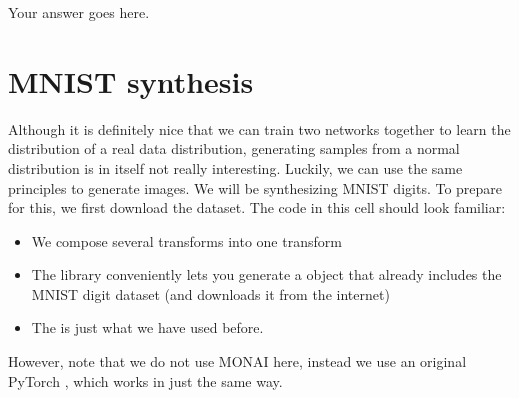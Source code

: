 \documentclass[letterpaper,10pt,english]{jupyterBook}
\begin{document}
\sphinxAtStartPar
Your answer goes here.


\chapter{MNIST synthesis}
\label{\detokenize{notebooks/Tutorial4_Generative_Models/Tutorial4_Generative_Models_student:mnist-synthesis}}
\sphinxAtStartPar
Although it is definitely nice that we can train two networks together to learn the distribution of a real data distribution, generating samples from a normal distribution is in itself not really interesting. Luckily, we can use the same principles to generate images. We will be synthesizing MNIST digits. To prepare for this, we first download the dataset. The code in this cell should look familiar:
\begin{itemize}
\item {} 
\sphinxAtStartPar
We compose several transforms into one transform

\item {} 
\sphinxAtStartPar
The  library conveniently lets you generate a  object that already includes the MNIST digit dataset (and downloads it from the internet)

\item {} 
\sphinxAtStartPar
The  is just what we have used before.

\end{itemize}

\sphinxAtStartPar
However, note that we do not use MONAI here, instead we use an original PyTorch , which works in just the same way.
\end{document}
